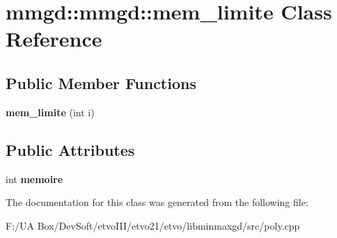 \section{mmgd\+:\+:mmgd\+:\+:mem\+\_\+limite Class Reference}
\label{classmmgd_1_1mmgd_1_1mem__limite}
\subsection*{Public Member Functions}
\begin{DoxyCompactItemize}
\item 
\mbox{\label{classmmgd_1_1mmgd_1_1mem__limite_aad2cbbb4c4badf1603cf5df569f6e9d3}} 
{\bfseries mem\+\_\+limite} (int i)
\end{DoxyCompactItemize}
\subsection*{Public Attributes}
\begin{DoxyCompactItemize}
\item 
\mbox{\label{classmmgd_1_1mmgd_1_1mem__limite_a3593e1dfa0fba70fd228277b9343c212}} 
int {\bfseries memoire}
\end{DoxyCompactItemize}


The documentation for this class was generated from the following file\+:\begin{DoxyCompactItemize}
\item 
F\+:/\+U\+A Box/\+Dev\+Soft/etvo\+I\+I\+I/etvo21/etvo/libminmaxgd/src/poly.\+cpp\end{DoxyCompactItemize}
